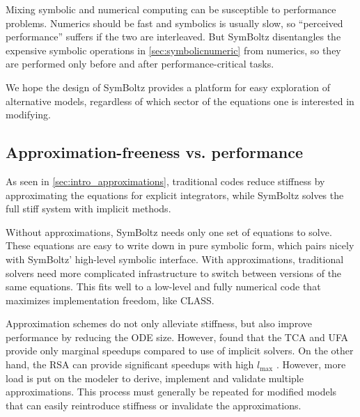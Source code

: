 \documentclass{aa}
\newcommand\lmax{l_\text{max}}
\begin{document}
\iffalse
Such an abstraction layer relies on identifying general properties of the symbolic equations that hold for both standard and extended models.
SymBoltz makes few and general assumptions here: the linearized Einstein-Boltzmann equations is fundamentally \emph{one} system of ordinary differential equations, but can be split up and solved in multiple computational stages (background, perturbations, line-of-sight integration, ...).
It is perhaps harder to code the logic for this generalized system, but once overcome it pays off by handling all models that fit into the framework for free.
It can be harder to create the solution to the general case over the special case, but once overcome the solution pays off because it handles for free.
\fi

Mixing symbolic and numerical computing can be susceptible to performance problems.
Numerics should be fast and symbolics is usually slow, so \enquote{perceived performance} suffers if the two are interleaved.
But SymBoltz disentangles the expensive symbolic operations in \cref{sec:symbolicnumeric} from numerics, so they are performed only before and after performance-critical tasks.

We hope the design of SymBoltz provides a platform for easy exploration of alternative models, regardless of which sector of the equations one is interested in modifying.

\subsection{Approximation-freeness vs. performance}

As seen in \cref{sec:intro_approximations}, traditional codes reduce stiffness by approximating the equations for explicit integrators,
while SymBoltz solves the full stiff system with implicit methods.

Without approximations, SymBoltz needs only one set of equations to solve.
These equations are easy to write down in pure symbolic form, which pairs nicely with SymBoltz' high-level symbolic interface.
With approximations, traditional solvers need more complicated infrastructure to switch between versions of the same equations.
This fits well to a low-level and fully numerical code that maximizes implementation freedom, like CLASS.

Approximation schemes do not only alleviate stiffness, but also improve performance by reducing the ODE size.
However, \cite{lesgourguesCosmicLinearAnisotropy2011a,hahnDISCODJDifferentiableEinsteinBoltzmann2024} found that the TCA and UFA provide only marginal speedups compared to use of implicit solvers.
On the other hand, the RSA can provide significant speedups with high $\lmax$ \citep{lesgourguesCosmicLinearAnisotropy2011a,moserSymbolicImplementationExtensions2022}.
However, more load is put on the modeler to derive, implement and validate multiple approximations.
This process must generally be repeated for modified models that can easily reintroduce stiffness or invalidate the approximations.
\end{document}
